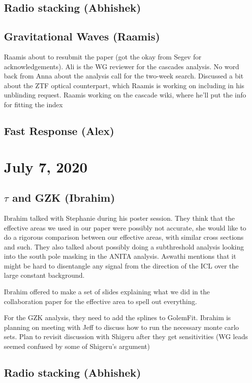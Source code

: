 \section{Radio stacking (Abhishek)}


\section{Gravitational Waves (Raamis)}
Raamis about to resubmit the paper (got the okay from Segev for acknowledgements). Ali is the WG reviewer for the cascades analysis. No word back from Anna about the analysis call for the two-week search. Discussed a bit about the ZTF optical counterpart, which Raamis is working on including in his unblinding request. Raamis working on the cascade wiki, where he'll put the info for fitting the index

\section{Fast Response (Alex)}


\chapter{July 7, 2020}
\section{$\tau$ and GZK (Ibrahim)}
Ibrahim talked with Stephanie during his poster session. They think that the effective areas we used in our paper were possibly not accurate, she would like to do a rigorous comparison between our effective areas, with similar cross sections and such. They also talked about possibly doing a subthreshold analysis looking into the south pole masking in the ANITA analysis. Aswathi mentions that it might be hard to disentangle any signal from the direction of the ICL over the large constant background.

Ibrahim offered to make a set of slides explaining what we did in the collaboration paper for the effective area to spell out everything. 

For the GZK analysis, they need to add the splines to GolemFit. Ibrahim is planning on meeting with Jeff to discuss how to run the necessary monte carlo sets. Plan to revisit discussion with Shigeru after they get sensitivities (WG leads seemed confused by some of Shigeru's argument)

\section{Radio stacking (Abhishek)}



